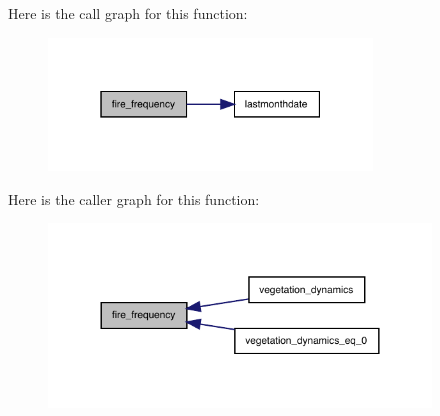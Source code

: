 Here is the call graph for this function\+:
\nopagebreak
\begin{figure}[H]
\begin{center}
\leavevmode
\includegraphics[width=244pt]{fire_8f90_aea4e862c5ebe7ca6ea0fb7003325d1c0_cgraph}
\end{center}
\end{figure}
Here is the caller graph for this function\+:
\nopagebreak
\begin{figure}[H]
\begin{center}
\leavevmode
\includegraphics[width=288pt]{fire_8f90_aea4e862c5ebe7ca6ea0fb7003325d1c0_icgraph}
\end{center}
\end{figure}
